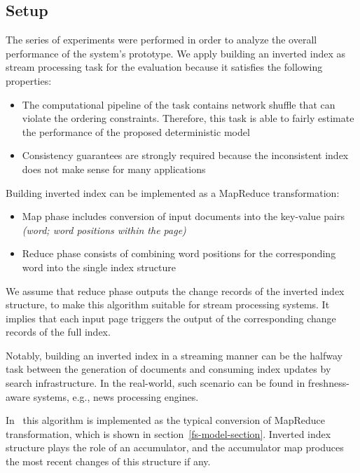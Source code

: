 
\label {fs-experiments-seciton}

\subsection{Setup}
The series of experiments were performed in order to analyze the overall performance of the system's prototype. We apply building an inverted index as stream processing task for the evaluation because it satisfies the following properties:

\begin{itemize}
    \item The computational pipeline of the task contains network shuffle that can violate the ordering constraints. Therefore, this task is able to fairly estimate the performance of the proposed deterministic model
    \item Consistency guarantees are strongly required because the inconsistent index does not make sense for many applications
\end{itemize}

Building inverted index can be implemented as a MapReduce transformation: 

\begin{itemize}
    \item Map phase includes conversion of input documents into the key-value pairs {\it (word; word positions within the page)}
    \item Reduce phase consists of combining word positions for the corresponding word into the single index structure 
\end{itemize}

We assume that reduce phase outputs the change records of the inverted index structure, to make this algorithm suitable for stream processing systems. It implies that each input page triggers the output of the corresponding change records of the full index. 

Notably, building an inverted index in a streaming manner can be the halfway task between the generation of documents and consuming index updates by search infrastructure. In the real-world, such scenario can be found in freshness-aware systems, e.g., news processing engines.
 
In \FlameStream\ this algorithm is implemented as the typical conversion of MapReduce transformation, which is shown in section~\ref{fs-model-section}. Inverted index structure plays the role of an accumulator, and the accumulator map produces the most recent changes of this structure if any.

